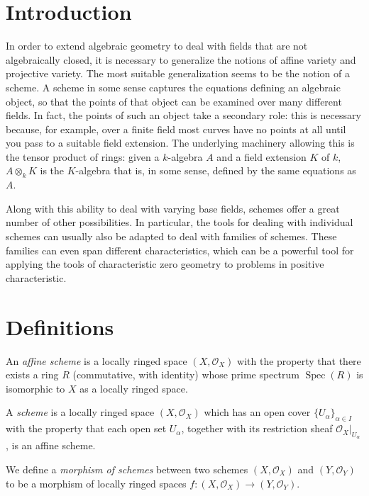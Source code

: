 \documentclass[12pt]{article}
\renewcommand{\O}{\mathcal{O}}
\newcommand{\lra}{\longrightarrow}
\newcommand{\Spec}{\operatorname{Spec}}
\begin{document}
\section{Introduction}

In order to extend algebraic geometry to deal with fields that are not algebraically closed, it is necessary to generalize the notions of affine variety and projective variety.  The most suitable generalization seems to be the notion of a scheme.  A scheme in some sense captures the equations defining an algebraic object, so that the points of that object can be examined over many different fields.  In fact, the points of such an object take a secondary role: this is necessary because, for example, over a finite field most curves have no points at all until you pass to a suitable field extension. The underlying machinery allowing this is the tensor product of rings: given a $k$-algebra $A$ and a field extension $K$ of $k$, $A\otimes_k K$ is the $K$-algebra that is, in some sense, defined by the same equations as $A$.

Along with this ability to deal with varying base fields, schemes offer a great number of other possibilities.  In particular, the tools for dealing with individual schemes can usually also be adapted to deal with families of schemes.  These families can even span different characteristics, which can be a powerful tool for applying the tools of characteristic zero geometry to problems in positive characteristic. 

\section{Definitions}

An \emph{affine scheme} is a locally ringed space $(X,\O_X)$ with the property that there exists a ring $R$ (commutative, with identity) whose prime spectrum $\Spec(R)$ is isomorphic to $X$ as a locally ringed space.

A \emph{scheme} is a locally ringed space $(X,\O_X)$ which has an open cover $\{U_\alpha\}_{\alpha \in I}$ with the property that each open set $U_\alpha$, together with its restriction sheaf $\O_X|_{U_\alpha}$, is an affine scheme.

We define a \emph{morphism of schemes} between two schemes $(X,\O_X)$ and $(Y,\O_Y)$ to be a morphism of locally ringed spaces $f: (X,\O_X) \lra (Y,\O_Y)$. 
\end{document}
